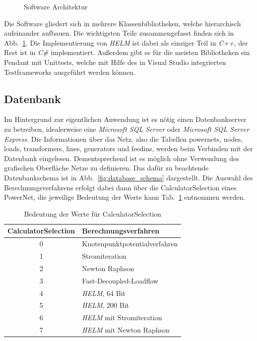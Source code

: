 \documentclass[12pt,a4paper]{article}
\newcommand{\reffig}[1]{{Abb.~\ref{#1}}}
\newcommand{\reftab}[1]{{Tab.~\ref{#1}}}
\begin{document}
	\begin{figure}
		\centering
		
		\caption{Software Architektur}
		\label{fig:software_architecture}
	\end{figure}
	Die Software gliedert sich in mehrere Klassenbibliotheken, welche hierarchisch aufeinander aufbauen. Die wichtigsten Teile zusammengefasst finden sich in \reffig{fig:software_architecture}. Die Implementierung von \emph{HELM} ist dabei als einziger Teil in \emph{C++}, der Rest ist in \emph{C\#} implementiert. Außerdem gibt es für die meisten Bibliotheken ein Pendant mit Unittests, welche mit Hilfe des in Visual Studio integrierten Testframeworks ausgeführt werden können.
	
	\subsection{Datenbank}
	Im Hintergrund zur eigentlichen Anwendung ist es nötig einen Datenbankserver zu betreiben, idealerweise eine \emph{Microsoft SQL Server} oder \emph{Microsoft SQL Server Express}. Die Informationen über das Netz, also die Tabellen powernets, nodes, loads, transformers, lines, generators und feedins, werden beim Verbinden mit der Datenbank eingelesen. Dementsprechend ist es möglich ohne Verwendung des grafischen Oberfläche Netze zu definieren. Das dafür zu beachtende Datenbankschema ist in \reffig{fig:database_schema} dargestellt. Die Auswahl des Berechnungsverfahrens erfolgt dabei dann über die CalculatorSelection eines PowerNet, die jeweilige Bedeutung der Werte kann \reftab{tab:calculator_selection} entnommen werden.
	
	\begin{table}
		\centering
		\begin{tabular}{c|l}
			CalculatorSelection & Berechnungsverfahren \\ \hline
			0 & Knotenpunktpotentialverfahren \\
	        1 & Stromiteration \\
	        2 & Newton Raphson \\
	        3 & Fast-Decoupled-Loadflow \\
	        4 & \emph{HELM}, 64 Bit \\
	        5 & \emph{HELM}, 200 Bit \\
	        6 & \emph{HELM} mit Stromiteration \\
	        7 & \emph{HELM} mit Newton Raphson
		\end{tabular}
		\caption{Bedeutung der Werte für CalculatorSelection}
		\label{tab:calculator_selection}
	\end{table}
	
\end{document}
